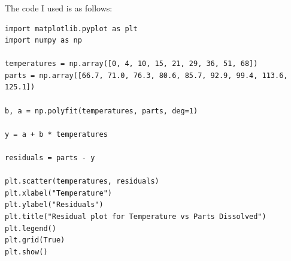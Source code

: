 \documentclass{article}
\begin{document}
{\begin{figure}[h!]
\end{figure}
\\
\\
\\ \\ \\ \\ \\ \\ \\ \\ \\ \\ \\ \\ \\
The code I used is as follows:
\begin{verbatim}
import matplotlib.pyplot as plt
import numpy as np

temperatures = np.array([0, 4, 10, 15, 21, 29, 36, 51, 68])
parts = np.array([66.7, 71.0, 76.3, 80.6, 85.7, 92.9, 99.4, 113.6, 125.1])

b, a = np.polyfit(temperatures, parts, deg=1)

y = a + b * temperatures 

residuals = parts - y

plt.scatter(temperatures, residuals)
plt.xlabel("Temperature")
plt.ylabel("Residuals")
plt.title("Residual plot for Temperature vs Parts Dissolved")
plt.legend()
plt.grid(True)
plt.show()
\end{verbatim}

}
\end{document}

